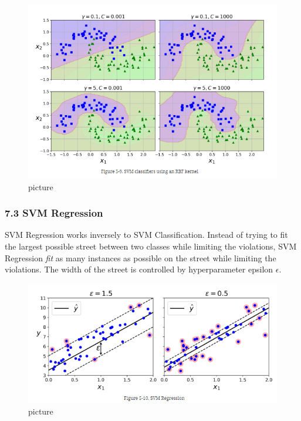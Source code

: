 \documentclass[
  letterpaper,
  DIV=11,
  numbers=noendperiod]{scrartcl}
\begin{document}
\begin{figure}[H]

{\centering \includegraphics{5.png}

}

\caption{picture}

\end{figure}%

\subsubsection{7.3 SVM Regression}\label{svm-regression}

SVM Regression works inversely to SVM Classification. Instead of trying
to fit the largest possible street between two classes while limiting
the violations, SVM Regression \emph{fit} as many instances as possible
on the street while limiting the violations. The width of the street is
controlled by hyperparameter epsilon \(\epsilon\).

\begin{figure}[H]

{\centering \includegraphics{6.png}

}

\caption{picture}

\end{figure}%
\end{document}
